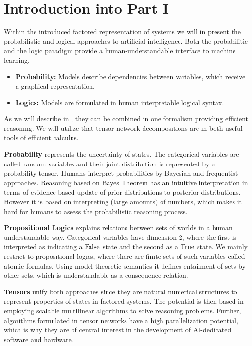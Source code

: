 \chapter{Introduction into Part I}

Within the introduced factored representation of systems we will in  present the probabilistic and logical approaches to artificial intelligence.
Both the probabilitic and the logic paradigm provide a human-understandable interface to machine learning.
\begin{itemize}
    \item \textbf{Probability:} Models describe dependencies between variables, which receive a graphical representation.
    \item \textbf{Logics:} Models are formulated in human interpretable logical syntax.
\end{itemize}
As we will describe in , they can be combined in one formalism providing efficient reasoning.
We will utilize that tensor network decompositions are in both useful tools of efficient calculus.



\textbf{Probability} represents the uncertainty of states.
The categorical variables are called random variables and their joint distribution is represented by a probability tensor.
Humans interpret probabilities by Bayesian and frequentist approaches.
Reasoning based on Bayes Theorem has an intuitive interpretation in terms of evidence based update of prior distributions to posterior distributions.
However it is based on interpreting (large amounts) of numbers, which makes it hard for humans to assess the probabilistic reasoning process.

\textbf{Propositional Logics} explains relations between sets of worlds in a human understandable way.
Categorical variables have dimension $2$, where the first is interpreted as indicating a $\mathrm{False}$ state and the second as a $\mathrm{True}$ state.
We mainly restrict to propositional logics, where there are finite sets of such variables called atomic formulas.
Using model-theoretic semantics it defines entailment of sets by other sets, which is understandable as a consequence relation.

\textbf{Tensors} unify both approaches since they are natural numerical structures to represent properties of states in factored systems.
The potential is then based in employing scalable multilinear algorithms to solve reasoning problems.
Further, algorithms formulated in tensor networks have a high parallelization potential, which is why they are of central interest in the development of AI-dedicated software and hardware.

